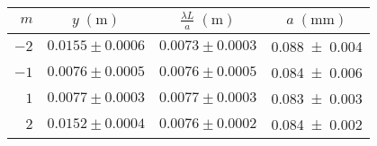 \documentclass[../main.tex]{subfiles}
\begin{document}
\begin{table}[ht!]
    \centering
    \caption{}
    \begin{tabular}{r|cc|c}
        \toprule
        $m$  & $y \; (\si{\metre})$ & $\frac{\lambda L}{a} \; (\si{\metre})$ & $a \; (\si{\mm})$ \\
        \midrule
        $-2$ & $0.0155 \pm 0.0006$ & $0.0073 \pm 0.0003$ & \num{0.088+-0.004} \\
        $-1$ & $0.0076 \pm 0.0005$ & $0.0076 \pm 0.0005$ & \num{0.084+-0.006} \\
        $1$  & $0.0077 \pm 0.0003$ & $0.0077 \pm 0.0003$ & \num{0.083+-0.003} \\
        $2$  & $0.0152 \pm 0.0004$ & $0.0076 \pm 0.0002$ & \num{0.084+-0.002} \\
        \bottomrule
    \end{tabular}
    \label{tab:minimi 0.08}
\end{table}



\end{document}
